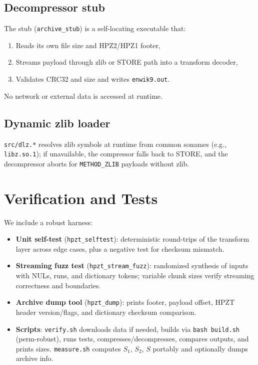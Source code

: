 \documentclass[11pt]{article}
\begin{document}
\subsection{Decompressor stub}
The stub (\texttt{archive\_stub}) is a self-locating executable that:
\begin{enumerate}[nosep]
  \item Reads its own file size and HPZ2/HPZ1 footer,
  \item Streams payload through zlib or STORE path into a transform decoder,
  \item Validates CRC32 and size and writes \texttt{enwik9.out}.
\end{enumerate}
No network or external data is accessed at runtime.

\subsection{Dynamic zlib loader}
\texttt{src/dlz.*} resolves zlib symbols at runtime from common sonames (e.g., \texttt{libz.so.1}); if unavailable, the compressor falls back to STORE, and the decompressor aborts for \texttt{METHOD\_ZLIB} payloads without zlib.

\section{Verification and Tests}
We include a robust harness:
\begin{itemize}[nosep]
  \item \textbf{Unit self-test} (\texttt{hpzt\_selftest}): deterministic round-trips of the transform layer across edge cases, plus a negative test for checksum mismatch.
  \item \textbf{Streaming fuzz test} (\texttt{hpzt\_stream\_fuzz}): randomized synthesis of inputs with NULs, runs, and dictionary tokens; variable chunk sizes verify streaming correctness and boundaries.
  \item \textbf{Archive dump tool} (\texttt{hpzt\_dump}): prints footer, payload offset, HPZT header version/flags, and dictionary checksum comparison.
  \item \textbf{Scripts}: \texttt{verify.sh} downloads data if needed, builds via \texttt{bash build.sh} (perm-robust), runs tests, compresses/decompresses, compares outputs, and prints sizes. \texttt{measure.sh} computes $S_1$, $S_2$, $S$ portably and optionally dumps archive info.
\end{itemize}
\end{document}
